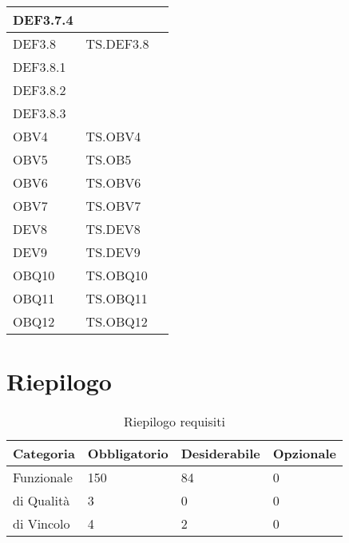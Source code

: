 \documentclass{scalatekids-article}
\begin{document}
\begin{longtable}[H]{|l|p{4cm}|p{4cm}|}
  \hline
  DEF3.7.4 & & \\
  \hline
  DEF3.8 & TS.DEF3.8 & \\
  \hline
  DEF3.8.1 & & \\
  \hline
  DEF3.8.2 & & \\
  \hline
  DEF3.8.3 & & \\
  \hline
  OBV4 & TS.OBV4 & \\
  \hline
  OBV5 & TS.OB5 & \\
  \hline
  OBV6 & TS.OBV6 & \\
  \hline
  OBV7 & TS.OBV7 & \\
  \hline
  DEV8 & TS.DEV8 & \\
  \hline
  DEV9 & TS.DEV9 & \\
  \hline
  OBQ10 & TS.OBQ10 & \\
  \hline
  OBQ11 & TS.OBQ11 & \\
  \hline
  OBQ12 & TS.OBQ12 & \\
  \hline
\end{longtable}

\section{Riepilogo}

\begin{table}[H]
  \centering
  \caption{Riepilogo requisiti}
  \begin{tabular}{|l|l|l|l|}
    \hline
    Categoria & Obbligatorio & Desiderabile & Opzionale\\
    \hline
    Funzionale & 150 & 84 & 0 \\
    \hline
    di Qualità & 3 & 0 & 0 \\
    \hline
    di Vincolo & 4 & 2 & 0 \\
    \hline
  \end{tabular}
\end{table}
\newpage
\appendix
\listoftables
\listoffigures
\end{document}
